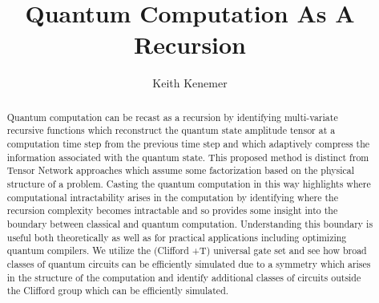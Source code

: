 \documentclass[reqno]{amsart}
\theoremstyle{definition}
\theoremstyle{remark}
\begin{document}

\title{Quantum Computation As A Recursion}

\author{Keith Kenemer}






\begin{abstract}
Quantum computation can be recast as a recursion by identifying multi-variate recursive functions which reconstruct the quantum state amplitude tensor at a computation time step from the previous time step and which adaptively compress the information associated with the quantum state. This proposed method  is distinct from Tensor Network approaches which assume some factorization based on the physical structure of a problem.   Casting the quantum computation in this way highlights where computational intractability arises in the computation by identifying where the recursion complexity becomes intractable and so provides some insight into the boundary between classical and quantum computation. Understanding this boundary is useful both theoretically as well as for practical applications including optimizing quantum compilers. We utilize the (Clifford +T) universal gate set and see how broad classes of quantum circuits can be efficiently simulated due to a symmetry which arises in the structure of the computation and identify additional classes of circuits outside the Clifford group which can be efficiently simulated.
\end{abstract}
\end{document}
